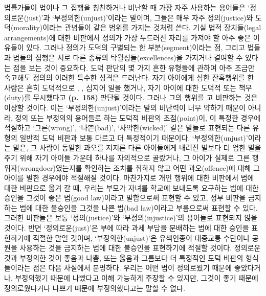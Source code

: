 법률가들이 법이나 그 집행을 칭찬하거나 비난할 때 가장 자주 사용하는
용어들은 ‘정의로운(just)’과 ‘부정의한(unjust)’이라는 말이며, 그들은 매우
자주 정의(justice)와 도덕(morality)이라는 관념들이 같은 범위를 가지는
것처럼 쓴다. 기실 법적 장치들(legal arrangements)에 대한 비판에서 정의가
가장 두드러진 자리를 가져야 할 아주 좋은 이유들이 있다. 그러나 정의가
도덕의 구별되는 한 부분(segment)이라는 점, 그리고 법들과 법들의 집행은
서로 다른 종류의 탁월성들(excellences)을 가지거나 결여할 수 있다는 점을
보는 것이 중요하다. 도덕 판단의 몇 가지 흔한 유형들에 관하여 아주 조금만
숙고해도 정의의 이러한 특수한 성격은 드러난다. 자기 아이에게 심한
잔혹행위를 한 사람은 흔히 도덕적으로 ,
, 심지어  일을 했거나, 자기 아이에
대한 도덕적  또는 책무(duty)를 무시했다고
\textbf{(p.~158)} 판단될 것이다. 그러나 그의 행위를
고 비판하는 것은 이상할 것이다. 이는
‘부정의한(unjust)’이라는 말의 비난력이 너무 약하기 때문이 아니라, 정의
또는 부정의의 용어들로 하는 도덕적 비판의 초점(point)이, 이 특정한
경우에 적절하고 ‘그른(wrong)’, ‘나쁜(bad)’, ‘사악한(wicked)’ 같은 말들로
표현되는 다른 유형의 일반적 도덕 비판과 보통 다르고 더 특정적이기
때문이다. ‘부정의한(unjust)’이라는 말은, 그 사람이 동일한 과오를 저지른
다른 아이들에게 내려진 벌보다 더 엄한 벌을 주기 위해 자기 아이들 가운데
하나를 자의적으로 골랐거나, 그 아이가 실제로 그른
행위자(wrongdoer)였는지를 확인하는 조치를 취하지 않고 어떤
과오(offence)에 대해 그 아이를 벌한 경우에야 적절해질 것이다. 마찬가지로
개인 행위에 대한 비판에서 법에 대한 비판으로 옮겨 갈 때, 우리는 부모가
자녀를 학교에 보내도록 요구하는 법에 대한 승인을 그것이 좋은 법(good
law)이라고 말함으로써 표현할 수 있고, 정부 비판을 금지하는 법에 대한
불승인을 그것을 나쁜 법(bad law)이라고 부름으로써 표현할 수 있다. 그러한
비판들은 보통 ‘정의(justice)’와 ‘부정의(injustice)’의 용어들로 표현되지
않을 것이다. 반면 ‘정의로운(just)’은 부에 따라 과세 부담을 분배하는 법에
대한 승인을 표현하기에 적절한 말일 것이며, ‘부정의한(unjust)’은
유색인종이 대중교통 수단이나 공원을 사용하는 것을 금지하는 법에 대한
불승인을 표현하기에 적절할 것이다. 정의로운 것과 부정의한 것이 좋음과
나쁨, 또는 옳음과 그름보다 더 특정적인 도덕 비판의 형식들이라는 점은
다음 사실에서 분명하다. 우리는 어떤 법이 정의로웠기 때문에 좋았다거나,
부정의했기 때문에 나빴다고 이해 가능하게 주장할 수 있지만, 그것이 좋기
때문에 정의로웠다거나 나쁘기 때문에 부정의했다고는 말할 수 없다.

